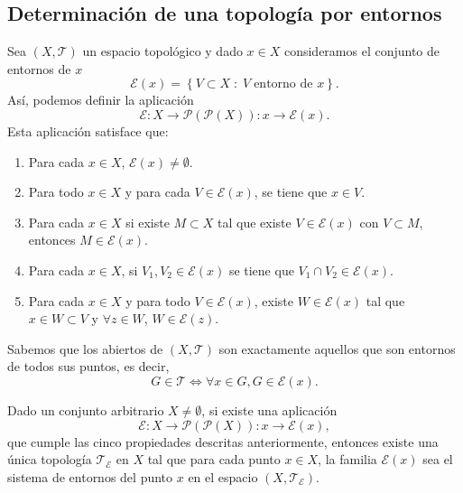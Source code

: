 \subsection{Determinación de una topología por entornos}
Sea $\displaystyle \left(X, \mathcal{T}\right) $ un espacio topológico y dado $\displaystyle x \in X $ consideramos el conjunto de entornos de $\displaystyle x $ 
\[\mathcal{E}\left(x\right)= \left\{ V \subset X \; : \; V \; \text{entorno de }x\right\}  .\]
Así, podemos definir la aplicación 
\[\mathcal{E} : X \to \mathcal{P}\left(\mathcal{P}\left(X\right)\right) : x \to \mathcal{E}\left(x\right) .\]
Esta aplicación satisface que:
\begin{enumerate}
\item Para cada $\displaystyle x \in X $, $\displaystyle \mathcal{E}\left(x\right)\neq \emptyset $. 
\item Para todo $\displaystyle x \in X $ y para cada $\displaystyle V \in \mathcal{E}\left(x\right) $, se tiene que $\displaystyle x \in V $. 
\item Para cada $\displaystyle x \in X $ si existe $\displaystyle M \subset X $ tal que existe $\displaystyle V \in \mathcal{E}\left(x\right) $ con $\displaystyle V \subset M $, entonces $\displaystyle M \in \mathcal{E}\left(x\right) $.
\item Para cada $\displaystyle x \in X $, si $\displaystyle V_{1}, V_{2}\in \mathcal{E}\left(x\right) $ se tiene que $\displaystyle V_{1} \cap V_{2} \in \mathcal{E}\left(x\right) $. 
\item Para cada $\displaystyle x \in X $ y para todo $\displaystyle  V \in \mathcal{E}\left(x\right) $, existe $\displaystyle W \in \mathcal{E}\left(x\right) $ tal que $\displaystyle x \in W \subset V $ y $\displaystyle \forall z \in W $, $\displaystyle W \in \mathcal{E}\left(z\right) $. 
\end{enumerate}
\begin{observation}
Sabemos que los abiertos de $\displaystyle \left(X, \mathcal{T}\right) $ son exactamente aquellos que son entornos de todos sus puntos, es decir,
\[G \in \mathcal{T} \iff \forall x \in G, G \in \mathcal{E}\left(x\right) .\]
\end{observation}
\begin{prop}
Dado un conjunto arbitrario $\displaystyle X \neq \emptyset $, si existe una aplicación 
\[\mathcal{E} : X \to \mathcal{P}\left(\mathcal{P}\left(X\right)\right) : x \to \mathcal{E}\left(x\right) ,\]
que cumple las cinco propiedades descritas anteriormente, entonces existe una única topología $\displaystyle \mathcal{T}_{\mathcal{E}} $ en $\displaystyle X $ tal que para cada punto $\displaystyle x \in X $, la familia $\displaystyle \mathcal{E}\left(x\right) $ sea el sistema de entornos del punto $\displaystyle x $ en el espacio $\displaystyle \left(X, \mathcal{T}_{\mathcal{E}}\right) $.
\end{prop}
